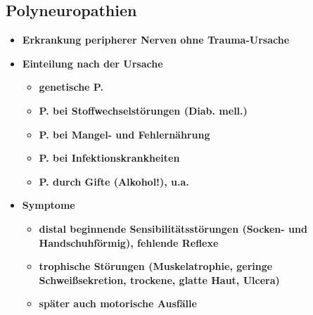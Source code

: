 		
\subsection{Polyneuropathien}
	\begin{itemize}
		\item \textbf{Erkrankung peripherer Nerven ohne Trauma-Ursache}
		\item \textbf{Einteilung nach der Ursache}
			\begin{itemize}
				\item \textbf{genetische P.}
				\item \textbf{P. bei Stoffwechselstörungen (Diab. mell.)}
				\item \textbf{P. bei Mangel- und Fehlernährung}
				\item \textbf{P. bei Infektionskrankheiten}
				\item \textbf{P. durch Gifte (Alkohol!), u.a.}
			\end{itemize}				
		\item \textbf{Symptome}
			\begin{itemize}
				\item \textbf{distal beginnende Sensibilitätsstörungen (Socken- und Handschuhförmig), fehlende Reflexe}
				\item \textbf{trophische Störungen (Muskelatrophie, geringe Schweißsekretion, trockene, glatte Haut, Ulcera)}
				\item \textbf{später auch motorische Ausfälle}
			\end{itemize}
	\end{itemize}